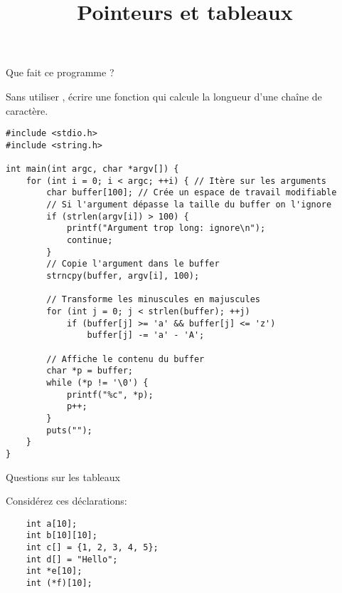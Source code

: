 \documentclass[french,a4paper,addpoints,11pt]{exam}
\title{Pointeurs et tableaux}
\begin{document}
\maketitle
\thispagestyle{headandfoot}

\begin{questions}

\question Que fait ce programme ?

\begin{solutionordottedlines}[6cm]

\end{solutionordottedlines}

\question Sans utiliser , écrire une fonction qui calcule la longueur d'une chaîne de caractère.

\begin{solutionordottedlines}[5cm]
\begin{lstlisting}
#include <stdio.h>
#include <string.h>

int main(int argc, char *argv[]) {
    for (int i = 0; i < argc; ++i) { // Itère sur les arguments
        char buffer[100]; // Crée un espace de travail modifiable
        // Si l'argument dépasse la taille du buffer on l'ignore
        if (strlen(argv[i]) > 100) {
            printf("Argument trop long: ignore\n");
            continue;
        }
        // Copie l'argument dans le buffer
        strncpy(buffer, argv[i], 100);

        // Transforme les minuscules en majuscules
        for (int j = 0; j < strlen(buffer); ++j)
            if (buffer[j] >= 'a' && buffer[j] <= 'z')
                buffer[j] -= 'a' - 'A';

        // Affiche le contenu du buffer
        char *p = buffer;
        while (*p != '\0') {
            printf("%c", *p);
            p++;
        }
        puts("");
    }
}
\end{lstlisting}
\end{solutionordottedlines}

\question Questions sur les tableaux

Considérez ces déclarations:

\begin{lstlisting}
    int a[10];
    int b[10][10];
    int c[] = {1, 2, 3, 4, 5};
    int d[] = "Hello";
    int *e[10];
    int (*f)[10];
\end{lstlisting}

\end{questions}
\end{document}
